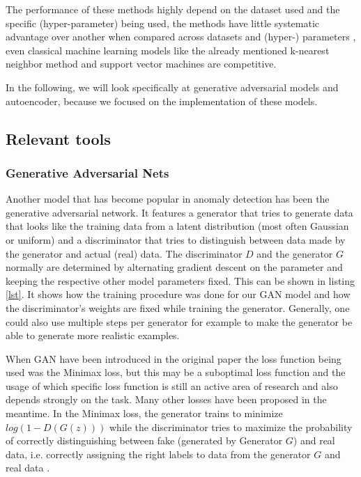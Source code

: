\documentclass[]{article}
\begin{document}
\noindent
The performance of these methods highly depend on the dataset used and the specific (hyper-parameter) being used, the methods have little systematic advantage over another when compared across datasets and (hyper-) parameters \cite{xxxx}, even classical machine learning models like the already mentioned k-nearest neighbor method and support vector machines are competitive. 
\newline

\noindent
In the following, we will look specifically at generative adversarial models and autoencoder, because we focused on the implementation of these models. 
	
	 
	 \subsection{Relevant tools}
	 \subsubsection{Generative Adversarial Nets}
	 Another model that has become popular in anomaly detection has been the generative adversarial network. It features a generator that tries to generate data that looks like the training data from a latent distribution (most often Gaussian or uniform) and a discriminator that tries to distinguish between data made by the generator and actual (real) data. The discriminator $D$ and the generator $G$ normally are determined by alternating gradient descent on the parameter and keeping the respective other model parameters fixed. This can be shown in listing \ref{lst}. It shows how the training procedure was done for our GAN model and how the discriminator's weights are fixed while training the generator. Generally, one could also use multiple steps per generator for example to make the generator be able to generate more realistic examples. 
	 \newline
	 
	 \noindent
	 When GAN have been introduced in the original paper the loss function being used was the Minimax loss, but this may be a suboptimal loss function and the usage of which specific loss function is still an active area of research and also depends strongly on the task. Many other losses have been proposed in the meantime. In the Minimax loss, the generator trains to minimize $log(1-D(G(z)))$ while the discriminator tries to maximize the probability of correctly distinguishing between fake (generated by Generator $G$) and real data, i.e. correctly assigning the right labels to data from the generator $G$ and real data \cite{https://doi.org/10.48550/arxiv.1406.2661}. 
	 
\end{document}
